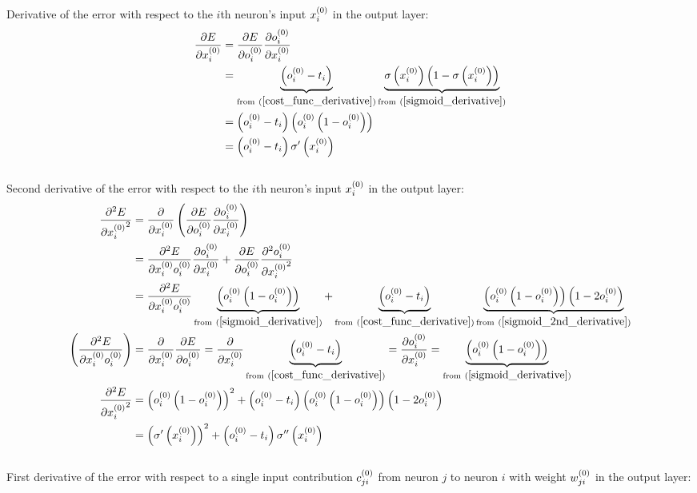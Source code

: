 \\[5pt]Derivative of the error with respect to the $i$th neuron's input $x_{i}^{(0)}$ in the output layer:
\begin{align}
\pdv{E}{\Input i 0} &= \pdv{E}{\Out i 0} \pdv{\Out i 0}{\Input i 0} 
\\
&= \underbrace{\left(\Out i 0 - \Target i\right)}_{\text{from} \ (\ref{cost_func_derivative})} \underbrace{\sigma\left(\Input i 0\right)\left(1 - \sigma\left(\Input i 0\right)\right)}
_{\text{from} \ (\ref{sigmoid_derivative})}
\\
&= \left(\Out i 0 - \Target i\right)\left(\Out i 0 \left(1 - \Out i 0\right)\right)
\\
&= \left(\Out i 0 - \Target i\right)\sigma^{\prime}\left(\Input i 0\right)\label{dedx}
\end{align}
\\[5pt]Second derivative of the error with respect to the $i$th neuron's input $x_{i}^{(0)}$ in the output layer:
\begin{align}
\pdv[2]{E}{{\Input i 0}} &= \pdv{}{\Input i 0}
\left(\pdv{E}{\Out i 0}\pdv{\Out i 0}{\Input i 0}\right) 
\\
&= \pdv{{^2}E}{{\Input i 0}{\Out i 0}}\pdv{\Out i 0}{\Input i 0} + \pdv{E}{\Out i 0}\pdv[2]{\Out i 0}{{\Input i 0}}
\\
&= \pdv{{^2}E}{{\Input i 0}{\Out i 0}}\underbrace{\left(\Out i 0 \left(1 - \Out i 0\right)\right)}_{{\text{from} \ (\ref{sigmoid_derivative})}} + \underbrace{\left(\Out i 0 - \Target i\right)}_{\text{from} \ (\ref{cost_func_derivative})}\underbrace{\left(\Out i 0 \left(1 - \Out i 0\right)\right)\left(1 - 2\Out i 0\right) }_{\text{from}\ (\ref{sigmoid_2nd_derivative})}
\\
\left(\pdv{{^2}E}{{\Input i 0}{\Out i 0}}\right) &= \pdv{}{\Input i 0}\pdv{E}{\Out i 0} = \pdv{}{\Input i 0}\underbrace{\left(\Out i 0 - \Target i\right)}_{\text{from} \ (\ref{cost_func_derivative})} = \pdv{\Out i 0}{\Input i 0} = \underbrace{\left(\Out i 0 \left(1 - \Out i 0\right)\right)}_{{\text{from} \ (\ref{sigmoid_derivative})}} 
\\
\pdv[2]{E}{{\Input i 0}}&= \left(\Out i 0 \left(1 - \Out i 0\right)\right)^2 + \left(\Out i 0 - \Target i\right)\left(\Out i 0 \left(1 - \Out i 0\right)\right)\left(1 - 2\Out i 0\right) 
\\
&= \left(\sigma^{\prime}\left(\Input i 0\right)\right)^2 + \left(\Out i 0 - \Target i\right)\sigma^{\prime\prime}\left(\Input i 0\right)\label{d2edx2}
\end{align}
\\[5pt]First derivative of the error with respect to a single input contribution $c_{ji}^{(0)}$ from neuron $j$ to neuron $i$ with weight $w_{ji}^{(0)}$ in the output layer:
